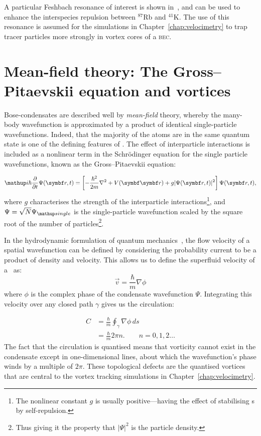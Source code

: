 A particular Feshbach resonance of interest is shown in~, and can be used to enhance the interspecies repulsion between $^{87}$Rb and $^{41}$K. The use of this resonance is assumed for the simulations in Chapter~\ref{chap:velocimetry} to trap tracer particles more strongly in vortex cores of a \textsc{bec}.

\section{Mean-field theory: The Gross--Pitaevskii equation and vortices}\label{sec:mean_field_theory}

Bose-condensates are described well by \emph{mean-field} theory, whereby the many-body wavefunction is approximated by a product of identical single-particle wavefunctions. Indeed, that the majority of the atoms are in the same quantum state is one of the defining features of \bec. The effect of interparticle interactions is included as a nonlinear term in the Schr\"odinger equation for the single particle wavefunctions, known as the Gross--Pitaevskii equation:

\begin{align}
\ii\hbar\pdv{t} \Psi(\vec r, t) = \left[-\frac{\hbar^2}{2m}\nabla^2 + V(\vec{\vec r}) + g|\Psi(\vec r, t)|^2\right]\Psi(\vec r, t),
\end{align}
where $g$ characterises the strength of the interparticle interactions\footnote{The nonlinear constant $g$ is usually positive---having the effect of stabilising \bec s by self-repulsion.}, and $\Psi = \sqrt{N}\Psi_\up{single}$ is the single-particle wavefunction scaled by the square root of the number of particles\footnote{Thus giving it the property that $|\Psi|^2$ is the particle density.}.

In the hydrodynamic formulation of quantum mechanics~\cite{madelung_quantentheorie_1927}, the flow velocity of a spatial wavefunction can be defined by considering the probability current to be a product of density and velocity. This allows us to define the superfluid velocity of a \bec\ as:
\begin{equation}
\vec v = \frac\hbar m \nabla\phi
\end{equation}
where $\phi$ is the complex phase of the condensate wavefunction $\Psi$. Integrating this velocity over any closed path $\gamma$ gives us the circulation:

\begin{align}
C &= \frac\hbar m\oint_\gamma\nabla\phi\,ds\\
  &= \frac\hbar m 2\pi n.\qquad n=0,1,2\dots
\end{align}
The fact that the circulation is quantised means that vorticity cannot exist in the condensate except in one-dimensional lines, about which the wavefunction's phase winds by a multiple of $2\pi$. These topological defects are the quantised vortices that are central to the vortex tracking simulations in Chapter~\ref{chap:velocimetry}.


